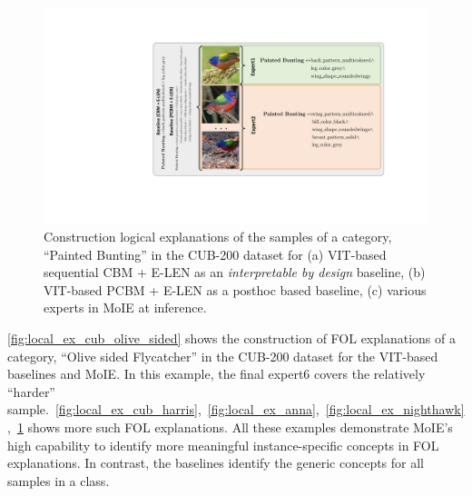 \begin{figure}[h]
\centering
\includegraphics[width=1 \linewidth]{figures/Supp/Painted_bunting.pdf}
\vspace{-10pt}
\caption{Construction logical explanations of the samples of a category, ``Painted Bunting'' in the CUB-200 dataset for (a) VIT-based sequential CBM + E-LEN as an \emph{interpretable by design} baseline, (b) VIT-based PCBM + E-LEN as a posthoc based baseline, (c) various experts in MoIE at inference. }
\label{fig:local_ex_cub_painted}
\vspace{-2.5pt}
\end{figure}

\cref{fig:local_ex_cub_olive_sided} shows the construction of FOL explanations of a category, ``Olive sided Flycatcher'' in the CUB-200 dataset for the VIT-based baselines and MoIE. In this example, the final expert6 covers the relatively ``harder'' sample.~\cref{fig:local_ex_cub_harris},~\cref{fig:local_ex_anna},~\cref{fig:local_ex_nighthawk},~\cref{fig:local_ex_cub_painted} shows more such FOL explanations. All these examples demonstrate MoIE's high capability to identify more meaningful instance-specific concepts in FOL explanations. In contrast, the baselines identify the generic concepts for all samples in a class.



